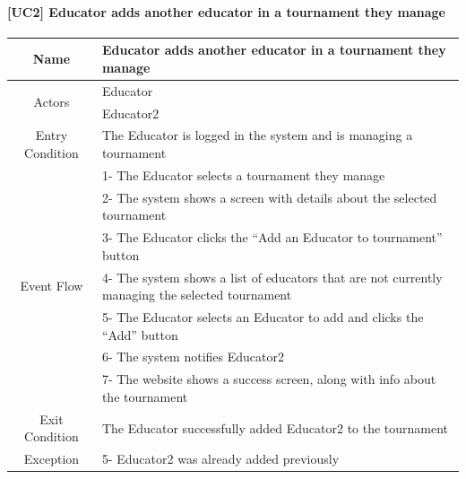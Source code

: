 \documentclass{article}
\begin{document}
\paragraph{[UC2] Educator adds another educator in a tournament they manage}
\begin{center}
\begin{tabular}{|c|m{40em}|}
\hline
Name & Educator adds another educator in a tournament they manage\\
\hline
\multirow{2}{4em}{Actors}
& Educator\\
& Educator2\\
\hline
Entry Condition & The Educator is logged in the system and is managing a tournament\\
\hline
\multirow{7}{4em}{Event Flow}
& 1- The Educator selects a tournament they manage\\
& 2- The system shows a screen with details about the selected tournament\\
& 3- The Educator clicks the “Add an Educator to tournament” button\\
& 4- The system shows a list of educators that are not currently managing the selected tournament\\
& 5- The Educator selects an Educator to add and clicks the “Add” button\\
& 6- The system notifies Educator2\\
& 7- The website shows a success screen, along with info about the tournament\\
\hline
Exit Condition & The Educator successfully added Educator2 to the tournament\\
\hline
Exception & 5- Educator2 was already added previously\\
\hline
\end{tabular}
\end{center}
\end{document}
